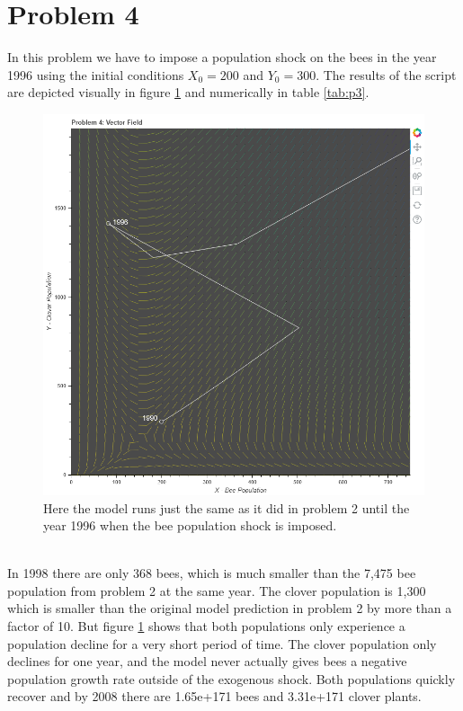 \documentclass[12pt,a4paper,titlepage]{report}
\begin{document}
	\section*{Problem 4}
		In this problem we have to impose a population shock on the bees in the year 1996 using the initial conditions \(X_{0} = 200\) and \(Y_{0} = 300\). The results of the script are depicted visually in figure \ref{fig:p4} and numerically in table \ref{tab:p3}.
		\begin{figure}[htbp]
			\centerline{\includegraphics[scale=.5]{charts/problem4_chart.png}}
			\caption{Here the model runs just the same as it did in problem 2 until the year 1996 when the bee population shock is imposed.}
			\label{fig:p4}
		\end{figure}\\
		In 1998 there are only 368 bees, which is much smaller than the 7,475 bee population from problem 2 at the same year. The clover population is 1,300 which is smaller than the original model prediction in problem 2 by more than a factor of 10. But figure \ref{fig:p4} shows that both populations only experience a population decline for a very short period of time. The clover population only declines for one year, and the model never actually gives bees a negative population growth rate outside of the exogenous shock. Both populations quickly recover and by 2008 there are 1.65e+171 bees and 3.31e+171 clover plants. 
	
\end{document}
